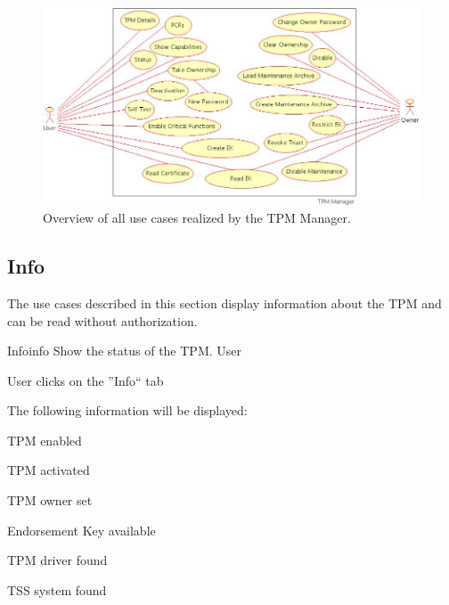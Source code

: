 \documentclass[
  american        %
]{sirrixreport}
\begin{document}
\begin{figure}[h]
 \centering
 \includegraphics[width=1\textwidth]{images/uc_overview}
 \caption{Overview of all use cases realized by the TPM Manager.}
 \label{overview}
\end{figure}
\clearpage

\subsection{Info}

The use cases described in this section display information about the TPM and can be read without authorization.

\begin{usecase}{Info}{info}
\ucdesc Show the status of the TPM.
\ucactors  User
\ucnormal 
 \item User clicks on the ''Info`` tab
 \item The following information will be displayed:
   \begin{compactitem}
   \item TPM enabled
   \item TPM activated
   \item TPM owner set
   \item Endorsement Key available
   \item TPM driver found
   \item TSS system found
   \end{compactitem}
\ucendflow 
\end{usecase}
\end{document}
